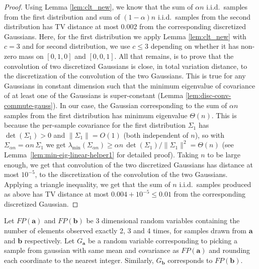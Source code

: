 \documentclass[10pt]{article} %
\theoremstyle{plain}
\newcommand{\ba}{\textbf{a}}
\newcommand{\bb}{\textbf{b}}
\begin{document}
\begin{proof}
	Using Lemma \ref{lem:clt_new}, we know that the sum of $\alpha n$ i.i.d.\ samples from the first distribution and sum of $(1-\alpha)n$ i.i.d.\ samples from the second distribution has TV distance at most $0.002$ from the corresponding discretized Gaussians. Here, for the first distribution we apply Lemma \ref{lem:clt_new} with $c = 3$ and for second distribution, we use $c \le 3$ depending on whether it has non-zero mass on $[0, 1, 0]$ and $[0, 0, 1]$. All that remains, is to prove that the convolution of two discretized Gaussians is close, in total variation distance, to the
	discretization of the convolution of the two Gaussians. This is true for any Gaussians in constant dimension such that the minimum eigenvalue of covariance of at least one of the Gaussians is super-constant 
    (Lemma \ref{lem:disc-conv-commute-gauss}). In our case, the Gaussian corresponding to the sum of $\alpha n$ samples from the first distribution has minimum eigenvalue $\Theta(n)$.
    This is because the per-sample covariance for the first distribution $\Sigma_1$ has $\det(\Sigma_1)>0$ and $\|\Sigma_1\|=O(1)$ (both independent of $n$), so with $\Sigma_{\alpha n}=\alpha n\,\Sigma_1$ we get $\lambda_{\min}(\Sigma_{\alpha n})\ge \alpha n\,\det(\Sigma_1)/\|\Sigma_1\|^2=\Theta(n)$ (see Lemma~\ref{lem:min-eig-linear-helper1} for detailed proof).
    Taking $n$ to be large enough, we get that convolution of the two discretized Gaussians has distance at most $10^{-5}$, to the
	discretization of the convolution of the two Gaussians. Applying a triangle inequality, we get that the sum of $n$ i.i.d.\ samples produced as above has TV distance at most $0.004 + 10^{-5} \leq 0.01$ from the corresponding discretized Gaussian.
    
\end{proof}



Let $FP(\ba)$ and $FP(\bb)$ be   3 dimensional random variables containing the number of elements observed exactly 2, 3 and 4 times, for samples drawn from $\ba$ and $\bb$ respectively. 
Let $G_\ba$ be a random variable corresponding to picking a sample from gaussian with same mean and covariance as  $FP(\ba)$ and rounding each coordinate to the nearest integer. Similarly, $G_\bb$ corresponds to $FP(\bb)$.
\end{document}

